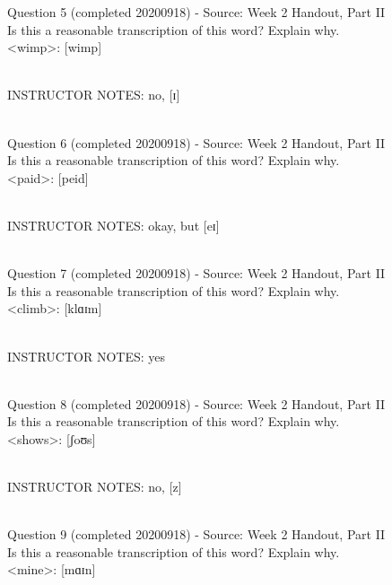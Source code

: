\documentclass[12pt]{article}
\begin{document}
{\large Question 5} (completed 20200918) - Source: Week 2 Handout, Part II\\

Is this a reasonable transcription of this word? Explain why.\\

<wimp>: {[wimp]}


~\\
INSTRUCTOR NOTES: no, [ɪ]


~\\

{\large Question 6} (completed 20200918) - Source: Week 2 Handout, Part II\\

Is this a reasonable transcription of this word? Explain why.\\

<paid>: {[peid]}


~\\
INSTRUCTOR NOTES: okay, but [eɪ]


~\\

{\large Question 7} (completed 20200918) - Source: Week 2 Handout, Part II\\

Is this a reasonable transcription of this word? Explain why.\\

<climb>: {[klɑɪm]}


~\\
INSTRUCTOR NOTES: yes


~\\

{\large Question 8} (completed 20200918) - Source: Week 2 Handout, Part II\\

Is this a reasonable transcription of this word? Explain why.\\

<shows>: {[ʃoʊs]}


~\\
INSTRUCTOR NOTES: no, [z]


~\\

{\large Question 9} (completed 20200918) - Source: Week 2 Handout, Part II\\

Is this a reasonable transcription of this word? Explain why.\\

<mine>: {[mɑɪn]}
\end{document}
